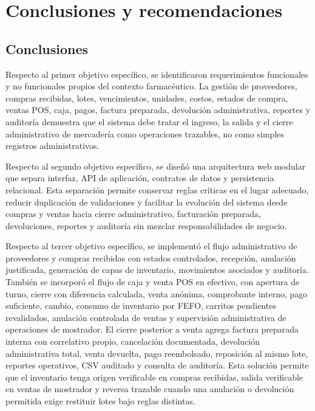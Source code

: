 \chapter{Conclusiones y recomendaciones}

\section{Conclusiones}

Respecto al primer objetivo específico, se identificaron requerimientos funcionales y no funcionales propios del contexto farmacéutico. La gestión de proveedores, compras recibidas, lotes, vencimientos, unidades, costos, estados de compra, ventas POS, caja, pagos, factura preparada, devolución administrativa, reportes y auditoría demuestra que el sistema debe tratar el ingreso, la salida y el cierre administrativo de mercadería como operaciones trazables, no como simples registros administrativos.

Respecto al segundo objetivo específico, se diseñó una arquitectura web modular que separa interfaz, API de aplicación, contratos de datos y persistencia relacional. Esta separación permite conservar reglas críticas en el lugar adecuado, reducir duplicación de validaciones y facilitar la evolución del sistema desde compras y ventas hacia cierre administrativo, facturación preparada, devoluciones, reportes y auditoría sin mezclar responsabilidades de negocio.

Respecto al tercer objetivo específico, se implementó el flujo administrativo de proveedores y compras recibidas con estados controlados, recepción, anulación justificada, generación de capas de inventario, movimientos asociados y auditoría. También se incorporó el flujo de caja y venta POS en efectivo, con apertura de turno, cierre con diferencia calculada, venta anónima, comprobante interno, pago suficiente, cambio, consumo de inventario por FEFO, carritos pendientes revalidados, anulación controlada de ventas y supervisión administrativa de operaciones de mostrador. El cierre posterior a venta agrega factura preparada interna con correlativo propio, cancelación documentada, devolución administrativa total, venta devuelta, pago reembolsado, reposición al mismo lote, reportes operativos, CSV auditado y consulta de auditoría. Esta solución permite que el inventario tenga origen verificable en compras recibidas, salida verificable en ventas de mostrador y reversa trazable cuando una anulación o devolución permitida exige restituir lotes bajo reglas distintas.

